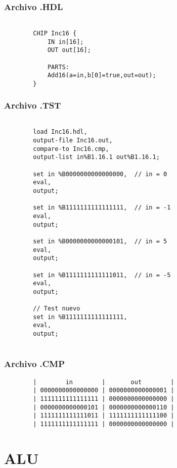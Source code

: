 \documentclass[12pt]{article}
\begin{document}
        \subsubsection{Archivo .HDL}
            \begin{lstlisting}
                
        CHIP Inc16 {
            IN in[16];
            OUT out[16];
        
            PARTS:
            Add16(a=in,b[0]=true,out=out);
        }
            \end{lstlisting}
        \subsubsection{Archivo .TST}
        \begin{lstlisting}

        load Inc16.hdl,
        output-file Inc16.out,
        compare-to Inc16.cmp,
        output-list in%B1.16.1 out%B1.16.1;
        
        set in %B0000000000000000,  // in = 0
        eval,
        output;
        
        set in %B1111111111111111,  // in = -1
        eval,
        output;
        
        set in %B0000000000000101,  // in = 5
        eval,
        output;
        
        set in %B1111111111111011,  // in = -5
        eval,
        output;
        
        // Test nuevo
        set in %B1111111111111111,
        eval,
        output;


        \end{lstlisting}

        \subsubsection{Archivo .CMP}
        \begin{lstlisting}
        |        in        |       out        |
        | 0000000000000000 | 0000000000000001 |
        | 1111111111111111 | 0000000000000000 |
        | 0000000000000101 | 0000000000000110 |
        | 1111111111111011 | 1111111111111100 |
        | 1111111111111111 | 0000000000000000 |
        \end{lstlisting}
\newpage
\section{ALU}
\end{document}
